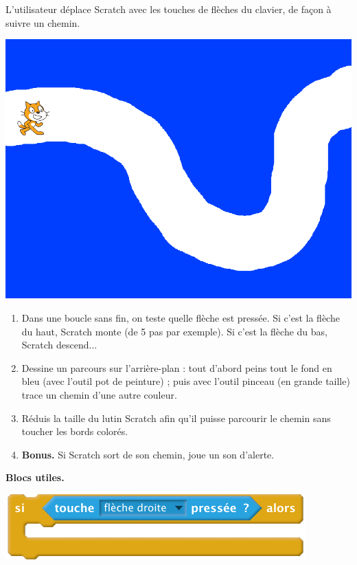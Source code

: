 \documentclass[class=report,crop=false, 12pt]{standalone}
\begin{document}
\begin{activite}

L'utilisateur déplace Scratch avec les touches de flèches du clavier, de façon à suivre un chemin.

\begin{center}
  \includegraphics[scale=\scaleecran,scale=1.4]{ecran-04-ex2} 
\end{center}

\begin{enumerate}
  \item Dans une boucle sans fin, on teste quelle flèche est pressée.
  Si c'est la flèche du haut, Scratch monte (de 5 pas par exemple). Si c'est la flèche du bas, Scratch descend...
  
  \item Dessine un parcours sur l'arrière-plan : tout d'abord peins tout le fond en bleu (avec l'outil pot de peinture) ; puis avec l'outil pinceau (en grande taille) trace un chemin d'une autre couleur.
  
  \item Réduis la taille du lutin Scratch afin qu'il puisse parcourir le chemin sans toucher les bords colorés.
  
  \item \textbf{Bonus.} Si Scratch sort de son chemin, joue un son d'alerte.
\end{enumerate}


\textbf{Blocs utiles.}
\begin{center}
  \includegraphics[scale=\scalebloc]{bloc-04-ex2} 
\end{center}


\end{activite}
\end{document}
